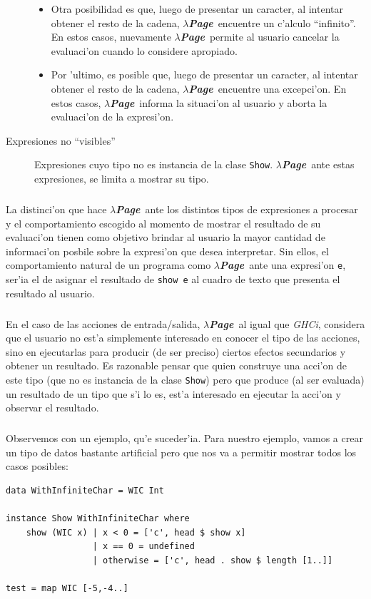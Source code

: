 \documentclass[a4paper]{article}
\newcommand{\hpage}{\textbf{\textsl{$\lambda$Page}}}
\begin{document}
\begin{description}
\begin{itemize}
			\item Otra posibilidad es que, luego de presentar un caracter, al intentar obtener el resto de la cadena, \hpage\ encuentre un c'alculo ``infinito''.  En estos casos, nuevamente \hpage\ permite al usuario cancelar la evaluaci'on cuando lo considere apropiado.
			\item Por 'ultimo, es posible que, luego de presentar un caracter, al intentar obtener el resto de la cadena, \hpage\ encuentre una excepci'on.  En estos casos, \hpage\ informa la situaci'on al usuario y aborta la evaluaci'on de la expresi'on.
		\end{itemize}
	\item[Expresiones no ``visibles''] Expresiones cuyo tipo no es instancia de la clase \texttt{Show}.  \hpage\, ante estas expresiones, se limita a mostrar su tipo.
\end{description}
\subparagraph{}La distinci'on que hace \hpage\ ante los distintos tipos de expresiones  a procesar y el comportamiento escogido al momento de mostrar el resultado de su evaluaci'on tienen como objetivo brindar al usuario la mayor cantidad de informaci'on posbile sobre la expresi'on que desea interpretar.  Sin ellos, el comportamiento natural de un programa como \hpage\ ante una expresi'on \texttt{e}, ser'ia el de asignar el resultado de \texttt{show e} al cuadro de texto que presenta el resultado al usuario.
\subparagraph{}En el caso de las acciones de entrada/salida, \hpage\ al igual que \textsl{GHCi}, considera que el usuario no est'a simplemente interesado en conocer el tipo de las acciones, sino en ejecutarlas para producir (de ser preciso) ciertos efectos secundarios y obtener un resultado.  Es razonable pensar que quien construye una acci'on de este tipo (que no es instancia de la clase \texttt{Show}) pero que produce (al ser evaluada) un resultado de un tipo que s'i lo es, est'a interesado en ejecutar la acci'on y observar el resultado.
\subparagraph{}Observemos con un ejemplo, qu'e suceder'ia.  Para nuestro ejemplo, vamos a crear un tipo de datos bastante artificial pero que nos va a permitir mostrar todos los casos posibles:
\begin{center}\begin{lstlisting}
data WithInfiniteChar = WIC Int

instance Show WithInfiniteChar where
    show (WIC x) | x < 0 = ['c', head $ show x]
			  	 | x == 0 = undefined
			  	 | otherwise = ['c', head . show $ length [1..]]

test = map WIC [-5,-4..]
\end{lstlisting}\end{center}
\end{document}
